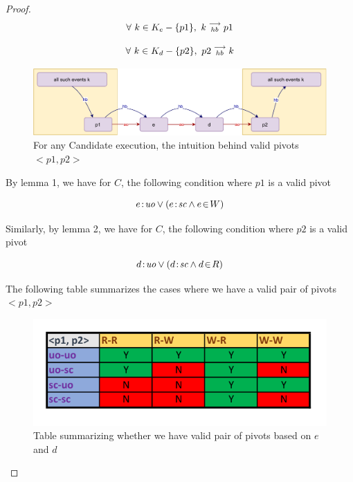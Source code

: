 \begin{proof}
        \[
            \forall \ k \in K_e-\{p1\}, \ k\stackrel{\longrightarrow}{_{hb}}p1 
        \]
        
        \[
            \forall \ k \in K_d - \{p2\}, \ \reln{p2}{hb}{k}
        \]
        
        \begin{figure}[H]
            \centering
            \includegraphics[scale=0.7]{Q1(d).pdf}
            \caption{For any Candidate execution, the intuition behind valid pivots $<p1,p2>$}
            \label{fig:my_label}
        \end{figure}
        
        
        By lemma 1, we have for $C$, the following condition where $p1$ is a valid pivot
        
        \[
            e\!:\!\textit{uo} \vee (e\!:\!\textit{sc} \wedge e\!\in\!W)
        \]
        
        Similarly, by lemma 2, we have for $C$, the following condition where $p2$ is a valid pivot
        
        \[
            d\!:\!\textit{uo} \vee (d\!:\!\textit{sc} \wedge d\!\in\!R)
        \]
        
        The following table summarizes the cases where we have a valid pair of pivots $<p1,p2>$
        \begin{figure}[H]
            \centering
            \includegraphics[scale=0.7]{Table1_Final.pdf}
            \caption{Table summarizing whether we have valid pair of pivots based on  $e$ and $d$}
            \label{fig:my_label}
        \end{figure}
        
        

\end{proof}

